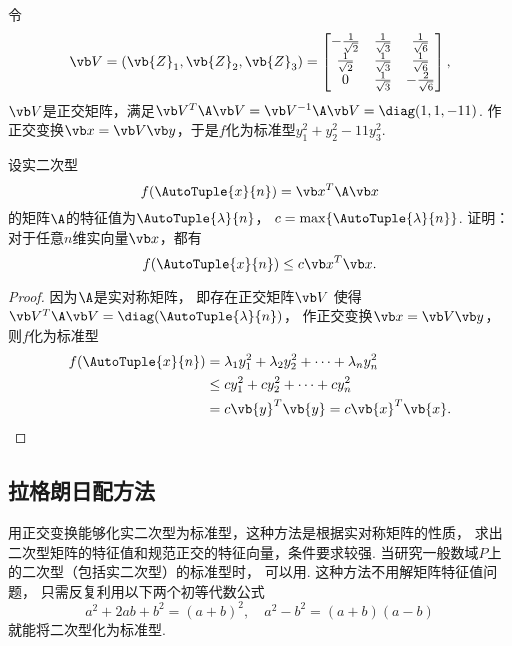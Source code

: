 \begin{example}
\begin{solution}
令\[
	\Q = (\vb{Z}_1,\vb{Z}_2,\vb{Z}_3)
	= \begin{bmatrix}
		-\frac{1}{\sqrt{2}} & \frac{1}{\sqrt{3}} & \frac{1}{\sqrt{6}} \\
		\frac{1}{\sqrt{2}} & \frac{1}{\sqrt{3}} & \frac{1}{\sqrt{6}} \\
		0 & \frac{1}{\sqrt{3}} & -\frac{2}{\sqrt{6}} \\
	\end{bmatrix},
\]\(\Q\)是正交矩阵，满足\(\Q^T\A\Q=\Q^{-1}\A\Q=\diag(1,1,-11)\).
作正交变换\(\x=\Q\y\)，于是\(f\)化为标准型\(y_1^2+y_2^2-11y_3^2\).
\end{solution}
\end{example}

\begin{example}
设实二次型\[
	f(\AutoTuple{x}{n})=\x^T\A\x
\]的矩阵\(\A\)的特征值为\(\AutoTuple{\lambda}{n}\)，
\(c=\max\{\AutoTuple{\lambda}{n}\}\).
证明：对于任意\(n\)维实向量\(\x\)，都有\[
	f(\AutoTuple{x}{n}) \leq c \x^T\x.
\]
\begin{proof}
因为\(\A\)是实对称矩阵，
即存在正交矩阵\(\Q\)
使得\(\Q^T\A\Q = \diag(\AutoTuple{\lambda}{n})\)，
作正交变换\(\x=\Q\y\)，
则\(f\)化为标准型\begin{align*}
	f(\AutoTuple{x}{n})
	&= \lambda_1 y_1^2 + \lambda_2 y_2^2 + \dotsb + \lambda_n y_n^2 \\
	&\leq c y_1^2 + c y_2^2 + \dotsb + c y_n^2 \\
	&= c \vb{y}^T \vb{y}
	= c \vb{x}^T \vb{x}.
	\qedhere
\end{align*}
\end{proof}
\end{example}

\subsection{拉格朗日配方法}
用正交变换能够化实二次型为标准型，这种方法是根据实对称矩阵的性质，
求出二次型矩阵的特征值和规范正交的特征向量，条件要求较强.
当研究一般数域\(P\)上的二次型（包括实二次型）的标准型时，
可以用.
这种方法不用解矩阵特征值问题，
只需反复利用以下两个初等代数公式\[
	a^2+2ab+b^2=(a+b)^2,
	\quad
	a^2-b^2=(a+b)(a-b)
\]就能将二次型化为标准型.

